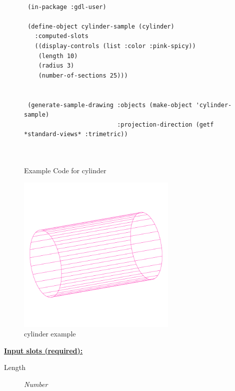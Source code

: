 \documentclass [11pt]{book}
\begin{document}
\begin{itemize}
\begin{figure}
\begin{lrbox}{\boxedverb}
\begin{minipage}{\linewidth}
{\begin{verbatim}

 (in-package :gdl-user)

 (define-object cylinder-sample (cylinder)
   :computed-slots
   ((display-controls (list :color :pink-spicy))
    (length 10)
    (radius 3)
    (number-of-sections 25)))


 (generate-sample-drawing :objects (make-object 'cylinder-sample)
                          :projection-direction (getf *standard-views* :trimetric))
   


\end{verbatim}}
\end{minipage}
\end{lrbox}
\fbox{\usebox{\boxedverb}}

\caption{Example Code for cylinder}

\label{fig:example-code-cylinder}

\end{figure}

\begin{figure}
\begin{center}
\includegraphics[width=3in,height=3in]{../images/example-cylinder.pdf}
\end{center}

\caption{cylinder example}

\label{fig:cylinder}

\end{figure}





\textbf{
\underline{Input slots (required):}}

\begin{description}

\item [Length]
\emph{Number}


\end{description}
\end{itemize}
\end{document}
